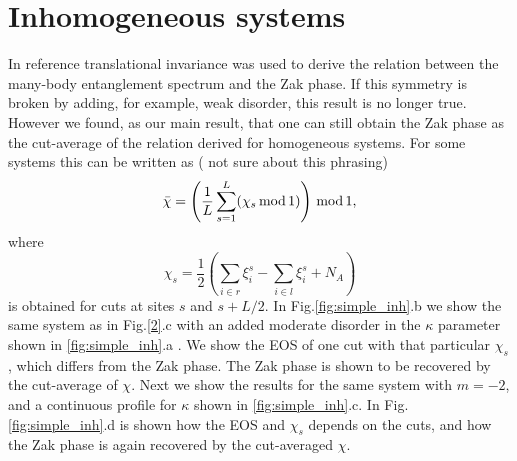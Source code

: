 \documentclass[twocolumn,amsmath,longbibliography,amssymb,superscriptaddress]{revtex4-1}
\newcommand{\carlos}[1]{{\color{red} #1}}
\begin{document}

\section{Inhomogeneous systems}

In reference \cite{Zaletel2014} translational invariance was used to derive the relation between the many-body entanglement spectrum and the Zak phase. If this symmetry is broken by adding, for example, weak disorder, this result is no longer true. However we found, as our main result, that one can still obtain the Zak phase as the cut-average of the relation derived for homogeneous systems. For some systems this can be written as (\carlos{not sure about this phrasing})
\begin{align}
\bar{\chi} =\left(\frac{1}{L}\sum_{s=1}^L (\chi_s \, \rm{mod} \, 1)\right)\, \rm{mod} \, 1,
\label{eq:inh_simple}
\end{align}
where
\begin{equation}
\chi_s = \frac{1}{2} \left( \sum_{i\in r}\xi^s_i-\sum_{i\in l}\xi^s_i  + N_A \right)
\end{equation}
is obtained for cuts at sites $s$ and $s+L/2$. In Fig.\ref{fig:simple_inh}.b we show the same system as in Fig.\ref{2}.c with an added moderate disorder in the $\kappa$ parameter shown in \ref{fig:simple_inh}.a . We show the EOS of one cut with that particular $\chi_s$, which differs from the Zak phase. The Zak phase is shown to be recovered by the cut-average of $\chi$. Next we show the results for the same system with $m=-2$, and a continuous profile for $\kappa$ shown in \ref{fig:simple_inh}.c. In Fig. \ref{fig:simple_inh}.d is shown how the EOS and $\chi_s$ depends on the cuts, and how the Zak phase is again recovered by the cut-averaged $\chi$.
\end{document}
